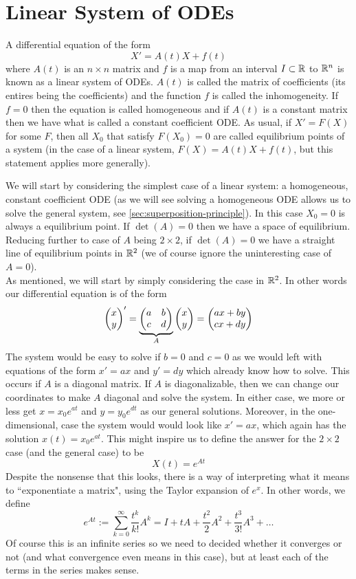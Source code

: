 

\section{Linear System of ODEs}

A differential equation of the form
$$ X' = A(t) X + f(t) $$
where $A(t)$ is an $n \times n$ matrix and $f$ is a map from an interval $I \subset \mathbb{R}$ to $\mathbb{R}^n$ is known as a linear system of ODEs. $A(t)$ is called the matrix of coefficients (its entires being the coefficients) and the function $f$ is called the inhomogeneity. If $f = 0$ then the equation is called homogeneous and if $A(t)$ is a constant matrix then we have what is called a constant coefficient ODE. As usual, if $X' = F(X)$ for some $F$, then all $X_0$ that satisfy $F(X_0) = 0$ are called equilibrium points of a system (in the case of a linear system, $F(X) = A(t) X + f(t)$, but this statement applies more generally). 

We will start by considering the simplest case of a linear system: a homogeneous, constant coefficient ODE (as we will see solving a homogeneous ODE allows us to solve the general system, see \autoref{sec:superposition-principle}). In this case $X_0 = 0$ is always a equilibrium point. If $\det(A) = 0$ then we have a space of equilibrium. Reducing further to case of $A$ being $2 \times 2$, if $\det(A) = 0$ we have a straight line of equilibrium points in $\mathbb{R}^2$ (we of course ignore the uninteresting case of $A = 0$).\\

As mentioned, we will start by simply considering the case in $\mathbb{R}^2$. In other words our differential equation is of the form
\begin{equation}\label{eq:hom-lin-eqn}
    \begin{pmatrix} x \\ y \end{pmatrix}' = \underbrace{\begin{pmatrix} a & b\\c & d \end{pmatrix}}_{A} \begin{pmatrix} x \\ y \end{pmatrix} = \begin{pmatrix} ax + by \\ cx + dy \end{pmatrix}
\end{equation}
The system would be easy to solve if $b = 0$ and $c = 0$ as we would left with equations of the form $x' = ax$ and $y' = dy$ which already know how to solve. This occurs if $A$ is a diagonal matrix. If $A$ is diagonalizable, then we can change our coordinates to make $A$ diagonal and solve the system. In either case, we more or less get $x = x_0 e^{at}$ and $y = y_0 e^{dt}$ as our general solutions. Moreover, in the one-dimensional, case the system would would look like $x' = ax$, which again has the solution $x(t) = x_0 e^{at}$. This might inspire us to define the answer for the $2 \times 2$ case (and the general case) to be
$$ X(t) = e^{At} $$
Despite the nonsense that this looks, there is a way of interpreting what it means to ``exponentiate a matrix", using the Taylor expansion of $e^x$. In other words, we define
$$ e^{At} := \sum_{k = 0}^{\infty} \frac{t^k}{k!} A^k = I + tA + \frac{t^2}{2}A^2 + \frac{t^3}{3!} A^3 + \dots $$
Of course this is an infinite series so we need to decided whether it converges or not (and what convergence even means in this case), but at least each of the terms in the series makes sense.

